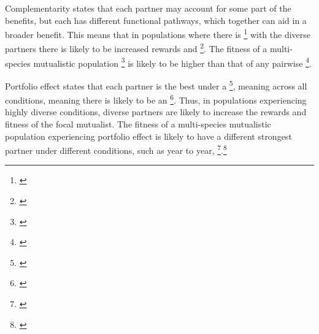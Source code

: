 \documentclass[12pt,a4paper]{article}
\newcommand{\tom}[2]{{\color{red}{#1}}\footnote{\textit{\color{red}{#2}}}}
\begin{document}
Complementarity states that each partner may account for some part of the benefits, but each has different functional pathways, which together can aid in a broader benefit\cite{Winfree2020}. 
This means that in populations where there is \tom{sufficient interaction}{What do you mean by ``sufficient''?} with the diverse partners there is likely to be increased rewards and \tom{fitness}{Whose fitness?}. 
The fitness of a multi-species mutualistic population \tom{experiencing complementarity}{I don't think sampling effect, complementarity, etc. are ``experienced''.} is likely to be higher than that of any pairwise \tom{mutualistic population}{What is a mutualistic population?}. 

Portfolio effect states that each partner is the best under a \tom{different set of conditions}{I could be wrong but I think the standard use of portfolio effect specifically refers to temporal variation.}, meaning across all conditions, meaning there is likely to be an \tom{increase in potential benefits}{Increase relative to what? Benefits to who? What are they potential?}\cite{Winfree2020}. 
Thus, in populations experiencing highly diverse conditions, diverse partners are likely to increase the rewards and fitness of the focal mutualist. 
The fitness of a multi-species mutualistic population experiencing portfolio effect is likely to have a different strongest partner under different conditions, such as year to year, \tom{and will experience similar fitness as they would in a pairwise mutualism with their best partner under any condition}{I don't follow this last part.}.\tom{}{You do a good job describing the mechanisms for positive diversity effects. I think you could rely more heavily on literature for these mechanisms, which is substantial.}  
\end{document}
